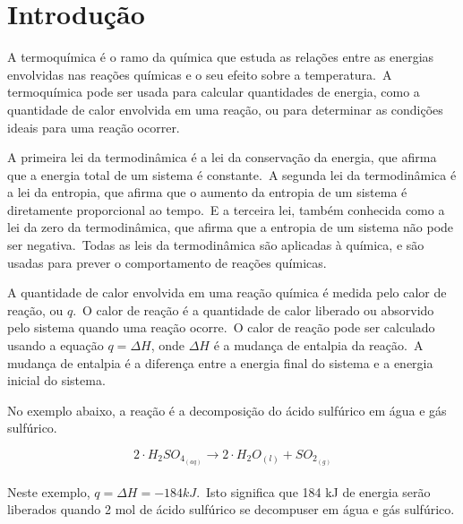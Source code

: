     \section{Introdução}\label{sec:intro}
    \indent A termoquímica é o ramo da química que estuda as relações entre as energias envolvidas nas reações químicas e o seu efeito sobre a temperatura.\ A termoquímica pode ser usada para calcular quantidades de energia, como a quantidade de calor envolvida em uma reação, ou para determinar as condições ideais para uma reação ocorrer.

    \indent A primeira lei da termodinâmica é a lei da conservação da energia, que afirma que a energia total de um sistema é constante.\ A segunda lei da termodinâmica é a lei da entropia, que afirma que o aumento da entropia de um sistema é diretamente proporcional ao tempo.\ E a terceira lei, também conhecida como a lei da zero da termodinâmica, que afirma que a entropia de um sistema não pode ser negativa.\ Todas as leis da termodinâmica são aplicadas à química, e são usadas para prever o comportamento de reações químicas.

    \indent A quantidade de calor envolvida em uma reação química é medida pelo calor de reação, ou $q$.\ O calor de reação é a quantidade de calor liberado ou absorvido pelo sistema quando uma reação ocorre.\ O calor de reação pode ser calculado usando a equação $q = \Delta H$, onde $\Delta H$ é a mudança de entalpia da reação.\ A mudança de entalpia é a diferença entre a energia final do sistema e a energia inicial do sistema.

    \indent No exemplo abaixo, a reação é a decomposição do ácido sulfúrico em água e gás sulfúrico.\

    \begin{equation}
        2\cdot H_2SO_4_{(aq)} \rightarrow 2\cdot H_2O_{(l)} + SO_2_{(g)} \label{eq:exemplo}
    \end{equation}\\

    \indent Neste exemplo, $q = \Delta H = -184 kJ$.\ Isto significa que 184 kJ de energia serão liberados quando 2 mol de ácido sulfúrico se decompuser em água e gás sulfúrico.\\



